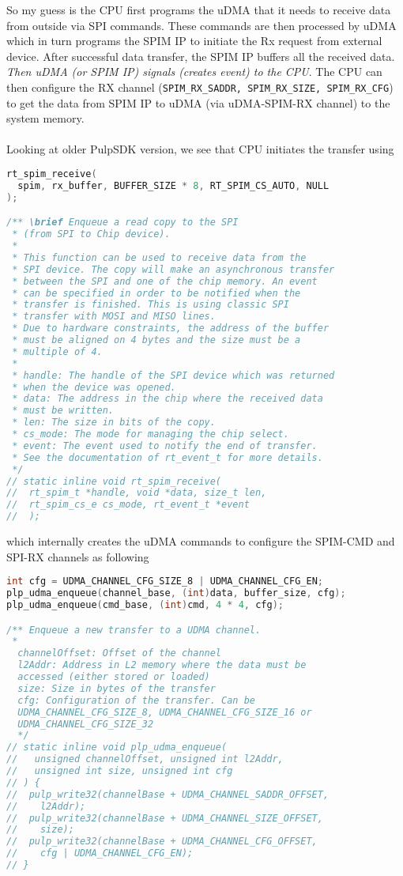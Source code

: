 \documentclass{article}
\begin{document}
So my guess is the
CPU first programs the uDMA that it needs to receive data from outside via SPI commands. These commands are then
processed by uDMA which in turn programs the SPIM IP to initiate the Rx request from external device. After
successful data transfer, the SPIM IP buffers all the received data. \textit{Then uDMA (or SPIM IP)
 signals (creates event) to the CPU}.
The CPU can then configure the RX channel (\texttt{SPIM\_RX\_SADDR, SPIM\_RX\_SIZE, SPIM\_RX\_CFG})
to get the data from SPIM IP to uDMA (via uDMA-SPIM-RX channel) to the system memory.
\\\\
Looking at older PulpSDK version, we see that CPU initiates the transfer using
%
\begin{lstlisting}[language=C]
rt_spim_receive(
  spim, rx_buffer, BUFFER_SIZE * 8, RT_SPIM_CS_AUTO, NULL
);

/** \brief Enqueue a read copy to the SPI
 * (from SPI to Chip device).
 *
 * This function can be used to receive data from the
 * SPI device. The copy will make an asynchronous transfer
 * between the SPI and one of the chip memory. An event
 * can be specified in order to be notified when the
 * transfer is finished. This is using classic SPI
 * transfer with MOSI and MISO lines.
 * Due to hardware constraints, the address of the buffer
 * must be aligned on 4 bytes and the size must be a
 * multiple of 4.
 *
 * handle: The handle of the SPI device which was returned
 * when the device was opened.
 * data: The address in the chip where the received data
 * must be written.
 * len: The size in bits of the copy.
 * cs_mode: The mode for managing the chip select.
 * event: The event used to notify the end of transfer.
 * See the documentation of rt_event_t for more details.
 */
// static inline void rt_spim_receive(
//  rt_spim_t *handle, void *data, size_t len,
//  rt_spim_cs_e cs_mode, rt_event_t *event
//  );
\end{lstlisting}
%
which internally creates the uDMA commands to configure the SPIM-CMD and SPI-RX channels as following
%
\begin{lstlisting}[language=C]
int cfg = UDMA_CHANNEL_CFG_SIZE_8 | UDMA_CHANNEL_CFG_EN;
plp_udma_enqueue(channel_base, (int)data, buffer_size, cfg);
plp_udma_enqueue(cmd_base, (int)cmd, 4 * 4, cfg);

/** Enqueue a new transfer to a UDMA channel.
 *
  channelOffset: Offset of the channel
  l2Addr: Address in L2 memory where the data must be
  accessed (either stored or loaded)
  size: Size in bytes of the transfer
  cfg: Configuration of the transfer. Can be
  UDMA_CHANNEL_CFG_SIZE_8, UDMA_CHANNEL_CFG_SIZE_16 or
  UDMA_CHANNEL_CFG_SIZE_32
  */
// static inline void plp_udma_enqueue(
//   unsigned channelOffset, unsigned int l2Addr,
//   unsigned int size, unsigned int cfg
// ) {
//  pulp_write32(channelBase + UDMA_CHANNEL_SADDR_OFFSET,
//    l2Addr);
//  pulp_write32(channelBase + UDMA_CHANNEL_SIZE_OFFSET,
//    size);
//  pulp_write32(channelBase + UDMA_CHANNEL_CFG_OFFSET,
//    cfg | UDMA_CHANNEL_CFG_EN);
// }

\end{lstlisting}
\end{document}
